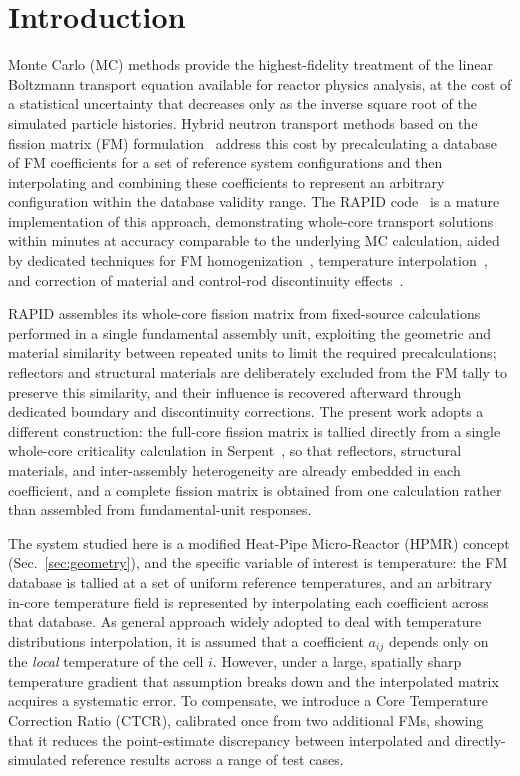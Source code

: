 \documentclass{style/nseJournal}
\begin{document}
\section{Introduction}
\label{sec:intro}
Monte Carlo (MC) methods provide the highest-fidelity treatment of the linear Boltzmann transport equation available for reactor physics analysis, at the cost of a statistical uncertainty that decreases only as the inverse square root of the simulated particle histories. Hybrid neutron transport methods based on the fission matrix (FM) formulation~\cite{CarneyANE2014} address this cost by precalculating a database of FM coefficients for a set of reference system configurations and then interpolating and combining these coefficients to represent an arbitrary configuration within the database validity range. The RAPID code~\cite{WaltersNSE2018} is a mature implementation of this approach, demonstrating whole-core transport solutions within minutes at accuracy comparable to the underlying MC calculation, aided by dedicated techniques for FM homogenization~\cite{HePNE2020Homog}, temperature interpolation~\cite{HeANE2020Temp}, and correction of material and control-rod discontinuity effects~\cite{HeANE2019,HePNE2020}.

RAPID assembles its whole-core fission matrix from fixed-source calculations performed in a single fundamental assembly unit, exploiting the geometric and material similarity between repeated units to limit the required precalculations; reflectors and structural materials are deliberately excluded from the FM tally to preserve this similarity, and their influence is recovered afterward through dedicated boundary and discontinuity corrections. The present work adopts a different construction: the full-core fission matrix is tallied directly from a single whole-core criticality calculation in Serpent~\cite{LeppanenEPJN2025}, so that reflectors, structural materials, and inter-assembly heterogeneity are already embedded in each coefficient, and a complete fission matrix is obtained from one calculation rather than assembled from fundamental-unit responses.

The system studied here is a modified Heat-Pipe Micro-Reactor (HPMR) concept (Sec.~\ref{sec:geometry}), and the specific variable of interest is temperature: the FM database is tallied at a set of uniform reference temperatures, and an arbitrary in-core temperature field is represented by interpolating each coefficient across that database. As general approach widely adopted to deal with temperature distributions interpolation, it is assumed that a coefficient $a_{ij}$ depends only on the \emph{local} temperature of the cell $i$. However, under a large, spatially sharp temperature gradient that assumption breaks down and the interpolated matrix acquires a systematic error. To compensate, we introduce a Core Temperature Correction Ratio (CTCR), calibrated once from two additional FMs, showing that it reduces the point-estimate discrepancy between interpolated and directly-simulated reference results across a range of test cases.
\end{document}
